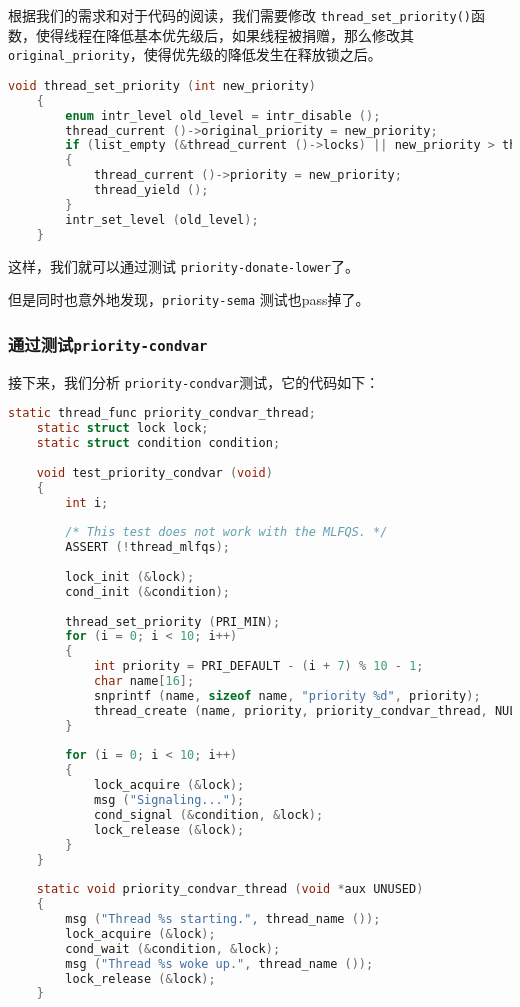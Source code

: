 \documentclass{article}
\begin{document}
	根据我们的需求和对于代码的阅读，我们需要修改 \texttt{thread\_set\_priority()}函数，使得线程在降低基本优先级后，如果线程被捐赠，那么修改其  \texttt{original\_priority}，使得优先级的降低发生在释放锁之后。
	
	\begin{lstlisting}[language=C, title=修改后的\texttt{thread\_set\_priority()}函数]
    void thread_set_priority (int new_priority) 
    {
    	enum intr_level old_level = intr_disable ();
    	thread_current ()->original_priority = new_priority;
    	if (list_empty (&thread_current ()->locks) || new_priority > thread_current ()->priority)
    	{
    		thread_current ()->priority = new_priority;
    		thread_yield ();
    	}
    	intr_set_level (old_level);
    }
	\end{lstlisting}
	
	这样，我们就可以通过测试 \texttt{priority-donate-lower}了。
	
	但是同时也意外地发现，\texttt{priority-sema} 测试也pass掉了。
	
	\subsubsection{通过测试\texttt{priority-condvar}}
	
	接下来，我们分析 \texttt{priority-condvar}测试，它的代码如下：
	
	\begin{lstlisting}[language=C, title=\texttt{priority-condvar}测试]
    static thread_func priority_condvar_thread;
    static struct lock lock;
    static struct condition condition;
    
    void test_priority_condvar (void) 
    {
    	int i;
    	
    	/* This test does not work with the MLFQS. */
    	ASSERT (!thread_mlfqs);
    	
    	lock_init (&lock);
    	cond_init (&condition);
    	
    	thread_set_priority (PRI_MIN);
    	for (i = 0; i < 10; i++) 
    	{
    		int priority = PRI_DEFAULT - (i + 7) % 10 - 1;
    		char name[16];
    		snprintf (name, sizeof name, "priority %d", priority);
    		thread_create (name, priority, priority_condvar_thread, NULL);
    	}
    	
    	for (i = 0; i < 10; i++) 
    	{
    		lock_acquire (&lock);
    		msg ("Signaling...");
    		cond_signal (&condition, &lock);
    		lock_release (&lock);
    	}
    }
    
    static void priority_condvar_thread (void *aux UNUSED) 
    {
    	msg ("Thread %s starting.", thread_name ());
    	lock_acquire (&lock);
    	cond_wait (&condition, &lock);
    	msg ("Thread %s woke up.", thread_name ());
    	lock_release (&lock);
    }
		
	\end{lstlisting}
	
\end{document}
